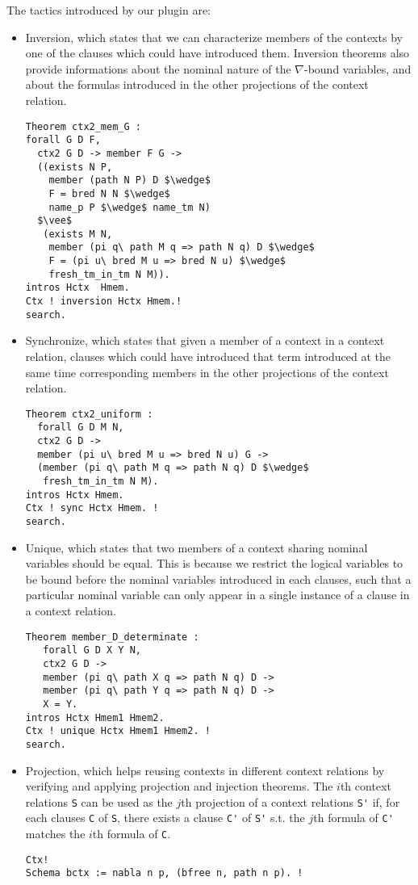 \documentclass[nocopyrightspace,authoryear]{sigplanconf}
\begin{document}
The tactics introduced by our plugin are:
\begin{itemize}
\item Inversion, which states that we can characterize members of the contexts by one of the clauses which could have introduced them. Inversion theorems also provide informations about the nominal nature of the $\nabla$-bound variables, and about the formulas introduced in the other projections of the context relation.

\begin{lstlisting}
Theorem ctx2_mem_G :
forall G D F,
  ctx2 G D -> member F G ->
  ((exists N P, 
    member (path N P) D $\wedge$
    F = bred N N $\wedge$  
    name_p P $\wedge$ name_tm N)
  $\vee$
   (exists M N, 
    member (pi q\ path M q => path N q) D $\wedge$ 
    F = (pi u\ bred M u => bred N u) $\wedge$  
    fresh_tm_in_tm N M)).
intros Hctx  Hmem. 
Ctx ! inversion Hctx Hmem.! 
search.
\end{lstlisting}

\item Synchronize, which states that given a member of a context in a context relation, clauses which could have introduced that term introduced at the same time corresponding members in the other projections of the context relation.
\begin{lstlisting}
Theorem ctx2_uniform :
  forall G D M N,
  ctx2 G D ->
  member (pi u\ bred M u => bred N u) G ->
  (member (pi q\ path M q => path N q) D $\wedge$ 
   fresh_tm_in_tm N M).
intros Hctx Hmem. 
Ctx ! sync Hctx Hmem. ! 
search.
\end{lstlisting}

\item Unique, which states that two members of a context sharing nominal variables should be equal. This is because we restrict the logical variables to be bound before the nominal variables introduced in each clauses, such that a particular nominal variable can only appear in a single instance of a clause in a context relation.   

\begin{lstlisting}
Theorem member_D_determinate :
   forall G D X Y N,
   ctx2 G D ->
   member (pi q\ path X q => path N q) D ->
   member (pi q\ path Y q => path N q) D ->
   X = Y.
intros Hctx Hmem1 Hmem2. 
Ctx ! unique Hctx Hmem1 Hmem2. ! 
search.
\end{lstlisting}

\item Projection, which helps reusing contexts in different context relations by verifying and applying projection and injection theorems. The $i$th context relations \lstinline|S| can be used as the $j$th projection of a context relations \lstinline|S'| if, for each clauses \lstinline|C| of \lstinline|S|, there exists a clause \lstinline|C'| of \lstinline|S'| s.t. the $j$th formula of \lstinline|C'| matches the $i$th formula of \lstinline|C|.
\begin{lstlisting}
Ctx!
Schema bctx := nabla n p, (bfree n, path n p). !



\end{lstlisting}
\end{itemize}
\end{document}
